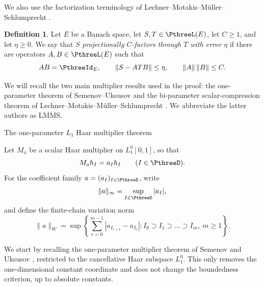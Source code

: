\documentclass[11pt,reqno]{amsart}
\makeatletter
\theoremstyle{plain}
\theoremstyle{definition}
\newtheorem{definition}[definition]{Definition}
\newcounter{problempaper}
\newenvironment{problempaperbody}{%
  \setcounter{subsection}{0}%
  \setcounter{subsubsection}{0}%
  \setcounter{paragraph}{0}%
  \renewcommand{\thesubsection}{\arabic{subsection}}%
  \renewcommand{\thesubsubsection}{\thesubsection.\arabic{subsubsection}}%
  \renewcommand{\theparagraph}{\thesubsubsection.\arabic{paragraph}}%
  \let\problem@outersection\section
  \let\problem@outersubsection\subsection
  \let\problem@outersubsubsection\subsubsection
  \let\problem@outerparagraph\paragraph
  \let\section\problem@papersection
  \let\subsection\problem@papersubsection
  \let\subsubsection\problem@papersubsubsection
}{%
  \let\section\problem@outersection
  \let\subsection\problem@outersubsection
  \let\subsubsection\problem@outersubsubsection
  \let\paragraph\problem@outerparagraph
}
\newcommand{\problem@target}[2]{%
  \hypertarget{problem-\theproblempaper-#1-#2}{}%
}
\newcommand{\problem@paperheading}[3]{%
  \par\bigskip
  \problem@target{#1}{#2}%
  \noindent{\large\bfseries #2.\quad #3\par}%
  \nobreak\smallskip
}
\newcommand{\problem@papersubheading}[3]{%
  \par\medskip
  \problem@target{#1}{#2}%
  \noindent{\normalsize\bfseries #2.\quad #3\par}%
  \nobreak\smallskip
}
\newcommand{\problem@papersubsubheading}[3]{%
  \par\smallskip
  \problem@target{#1}{#2}%
  \noindent{\normalsize\itshape #2.\quad #3.\ }%
}
\def\problem@papersection{%
  \@ifstar{\problem@papersectionstar}{\problem@papersectionnostar}%
}
\def\problem@papersectionstar#1{%
  \par\bigskip\noindent{\large\bfseries #1\par}\nobreak\smallskip
}
\def\problem@papersectionnostar#1{%
  \refstepcounter{subsection}%
  \setcounter{subsubsection}{0}%
  \setcounter{paragraph}{0}%
  \problem@paperheading{section}{\thesubsection}{#1}%
  \problem@writecontentsline{section}{\thesubsection}{#1}%
}
\def\problem@papersubsection{%
  \@ifstar{\problem@papersubsectionstar}{\problem@papersubsectionnostar}%
}
\def\problem@papersubsectionstar#1{%
  \par\medskip\noindent{\normalsize\bfseries #1\par}\nobreak\smallskip
}
\def\problem@papersubsectionnostar#1{%
  \refstepcounter{subsubsection}%
  \setcounter{paragraph}{0}%
  \problem@papersubheading{subsection}{\thesubsubsection}{#1}%
  \problem@writecontentsline{subsection}{\thesubsubsection}{#1}%
}
\def\problem@papersubsubsection{%
  \@ifstar{\problem@papersubsubsectionstar}{\problem@papersubsubsectionnostar}%
}
\def\problem@papersubsubsectionstar#1{%
  \par\smallskip\noindent{\normalsize\itshape #1.\ }%
}
\def\problem@papersubsubsectionnostar#1{%
  \refstepcounter{paragraph}%
  \problem@papersubsubheading{subsubsection}{\theparagraph}{#1}%
  \problem@writecontentsline{subsubsection}{\theparagraph}{#1}%
}
\newcommand{\problem@writecontentsline}[3]{%
  \begingroup
  \protected@write\@auxout{}{%
    \string\problemcontentsentry{\theproblempaper}{#1}{#2}{#3}{\thepage}%
  }%
  \endgroup
}
\newcommand{\problemcontentsentry}[5]{%
  \@ifundefined{problemcontents@#1}{%
    \expandafter\gdef\csname problemcontents@#1\endcsname{}%
  }{}%
  \expandafter\g@addto@macro\csname problemcontents@#1\endcsname{%
    \problemcontentsline{#1}{#2}{#3}{#4}{#5}%
  }%
}
\newcommand{\problemcontentslink}[4]{%
  \hyperlink{problem-#1-#2-#3}{#4}%
}
\newcommand{\problemcontentsline}[5]{%
  \ifstrequal{#2}{section}{%
    \par\noindent
    \problemcontentslink{#1}{#2}{#3}{\makebox[2.5em][l]{#3}#4}%
    \nobreak\dotfill
    \problemcontentslink{#1}{#2}{#3}{#5}\par
  }{%
    \ifstrequal{#2}{subsection}{%
      \par\noindent\hspace*{1.5em}%
      \problemcontentslink{#1}{#2}{#3}{\makebox[3.5em][l]{#3}#4}%
      \nobreak\dotfill
      \problemcontentslink{#1}{#2}{#3}{#5}\par
    }{%
      \par\noindent\hspace*{3em}%
      \problemcontentslink{#1}{#2}{#3}{\makebox[4.5em][l]{#3}#4}%
      \nobreak\dotfill
      \problemcontentslink{#1}{#2}{#3}{#5}\par
    }%
  }%
}
\makeatother
\begin{document}
\begin{problempaperbody}
We also use the factorization terminology of Lechner--Motakis--M\"uller--Schlumprecht \cite[Definition~2.2]{LechnerMotakisMullerSchlumprecht2024}. 

\begin{definition}
    Let $E$ be a Banach space, let $S,T\in\PthreeL(E)$, let $C\geq 1$, and let $\eta\geq 0$. We say that $S$ \emph{projectionally $C$-factors through $T$ with error $\eta$} if there are operators $A,B\in\PthreeL(E)$ such that
    \begin{equation*}
            AB=\PthreeId_E,\qquad
            \|S-ATB\|\leq\eta,\qquad
            \|A\|\,\|B\|\leq C .
    \end{equation*}
\end{definition}

We will recall the two main multiplier results used in the proof: the one-parameter theorem of Semenov--Uksusov \cite[Theorem~3]{SemenovUksusov2012} and the bi-parameter scalar-compression theorem of Lechner--Motakis--M\"uller--Schlumprecht \cite[Theorem~2.3]{LechnerMotakisMullerSchlumprecht2024}. We abbreviate the latter authors as LMMS.

\subsection{The one-parameter $L_1$ Haar multiplier theorem}
\label{p3:sec:su-result}

Let $M_a$ be a scalar Haar multiplier on $L_1^0[0,1]$, so that
\begin{equation*}
        M_a h_I=a_Ih_I\qquad (I\in\PthreeD).
\end{equation*}
For the coefficient family $a=(a_I)_{I\in\PthreeD}$, write
\begin{equation*}
        \|a\|_\infty=\sup_{I\in\PthreeD}|a_I|,
\end{equation*}
and define the finite-chain variation norm
\begin{equation*}
        \|a\|_W =
        \sup\left\{
        \sum_{r=0}^{m-1}|a_{I_{r+1}}-a_{I_r}|:
        I_0\supset I_1\supset\ldots\supset I_m,\ m\geq 1
        \right\}.
\end{equation*}

We start by recalling the one-parameter multiplier theorem of Semenov and Uksusov \cite[Theorem~3]{SemenovUksusov2012}, restricted to the cancellative Haar subspace $L_1^0$. This only removes the one-dimensional constant coordinate and does not change the boundedness criterion, up to absolute constants.


\end{problempaperbody}
\end{document}
